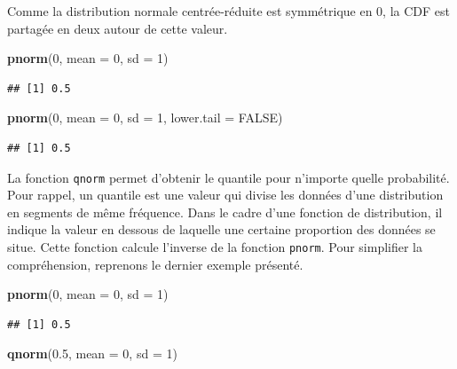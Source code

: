 \documentclass[
]{book}
\newenvironment{Shaded}{\begin{snugshade}}{\end{snugshade}}
\newcommand{\AttributeTok}[1]{\textcolor[rgb]{0.13,0.29,0.53}{#1}}
\newcommand{\ConstantTok}[1]{\textcolor[rgb]{0.56,0.35,0.01}{#1}}
\newcommand{\DecValTok}[1]{\textcolor[rgb]{0.00,0.00,0.81}{#1}}
\newcommand{\FloatTok}[1]{\textcolor[rgb]{0.00,0.00,0.81}{#1}}
\newcommand{\FunctionTok}[1]{\textcolor[rgb]{0.13,0.29,0.53}{\textbf{#1}}}
\newcommand{\NormalTok}[1]{#1}
\begin{document}
Comme la distribution normale centrée-réduite est symmétrique en 0, la CDF est partagée en deux autour de cette valeur.

\begin{Shaded}
\begin{Highlighting}[]
\FunctionTok{pnorm}\NormalTok{(}\DecValTok{0}\NormalTok{, }\AttributeTok{mean =} \DecValTok{0}\NormalTok{, }\AttributeTok{sd =} \DecValTok{1}\NormalTok{) }
\end{Highlighting}
\end{Shaded}

\begin{verbatim}
## [1] 0.5
\end{verbatim}

\begin{Shaded}
\begin{Highlighting}[]
\FunctionTok{pnorm}\NormalTok{(}\DecValTok{0}\NormalTok{, }\AttributeTok{mean =} \DecValTok{0}\NormalTok{, }\AttributeTok{sd =} \DecValTok{1}\NormalTok{, }\AttributeTok{lower.tail =} \ConstantTok{FALSE}\NormalTok{)}
\end{Highlighting}
\end{Shaded}

\begin{verbatim}
## [1] 0.5
\end{verbatim}

La fonction \texttt{qnorm} permet d'obtenir le quantile pour n'importe quelle probabilité. Pour rappel, un quantile est une valeur qui divise les données d'une distribution en segments de même fréquence. Dans le cadre d'une fonction de distribution, il indique la valeur en dessous de laquelle une certaine proportion des données se situe. Cette fonction calcule l'inverse de la fonction \texttt{pnorm}. Pour simplifier la compréhension, reprenons le dernier exemple présenté.

\begin{Shaded}
\begin{Highlighting}[]
\FunctionTok{pnorm}\NormalTok{(}\DecValTok{0}\NormalTok{, }\AttributeTok{mean =} \DecValTok{0}\NormalTok{, }\AttributeTok{sd =} \DecValTok{1}\NormalTok{) }
\end{Highlighting}
\end{Shaded}

\begin{verbatim}
## [1] 0.5
\end{verbatim}

\begin{Shaded}
\begin{Highlighting}[]
\FunctionTok{qnorm}\NormalTok{(}\FloatTok{0.5}\NormalTok{, }\AttributeTok{mean =} \DecValTok{0}\NormalTok{, }\AttributeTok{sd =} \DecValTok{1}\NormalTok{)}
\end{Highlighting}
\end{Shaded}
\end{document}
